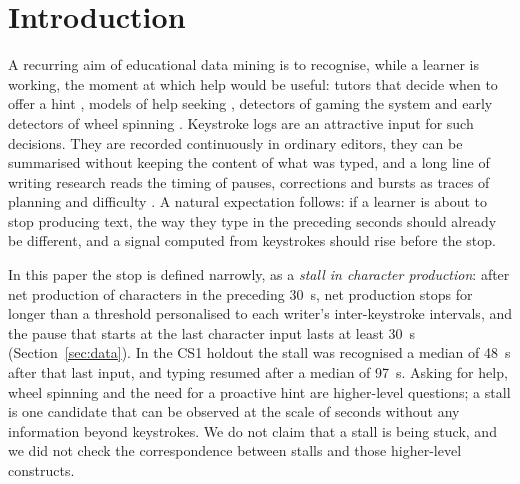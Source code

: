\section{Introduction}
\label{sec:intro}

A recurring aim of educational data mining is to recognise, while a learner is working, the moment at which help would
be useful: tutors that decide when to offer a hint \cite{maniktala2020helpneed}, models of help seeking
\cite{aleven2006helpseeking}, detectors of gaming the system \cite{baker2005gaming} and early detectors of wheel
spinning \cite{zhang2019wheel}. Keystroke logs are an attractive input for such decisions. They are recorded
continuously in ordinary editors, they can be summarised without keeping the content of what was typed, and a long line
of writing research reads the timing of pauses, corrections and bursts as traces of planning and difficulty
\cite{baaijen2012keystroke,roeser2024disfluencies,conijn2022tagset,conijn2024revision,vasylets2025alignment}. A natural
expectation follows: if a learner is about to stop producing text, the way they type in the preceding seconds should
already be different, and a signal computed from keystrokes should rise before the stop.

In this paper the stop is defined narrowly, as a \emph{stall in character production}: after net production of
characters in the preceding 30~s, net production stops for longer than a threshold personalised to each writer's
inter-keystroke intervals, and the pause that starts at the last character input lasts at least 30~s
(Section~\ref{sec:data}). In the CS1 holdout the stall was recognised a median of 48~s after that last input, and
typing resumed after a median of 97~s. Asking for help, wheel spinning and the need for a proactive hint are higher-level questions; a stall is one
candidate that can be observed at the scale of seconds without any information beyond keystrokes. We do not claim that
a stall is being stuck, and we did not check the correspondence between stalls and those higher-level constructs.

